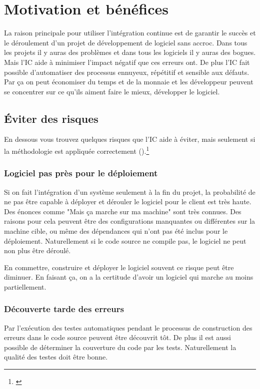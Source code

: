 \chapter{Motivation et bénéfices}

La raison principale pour utiliser l'intégration continue est de garantir le succès et le déroulement d'un projet de développement de logiciel sans accroc. Dans tous les projets il y auras des problèmes et dans tous les logiciels il y auras des bogues. Mais l'IC aide à minimiser l'impact négatif que ces erreurs ont. De plus l'IC fait possible d'automatiser des processus ennuyeux, répétitif et sensible aux défauts. Par ça on peut économiser du temps et de la monnaie et les développeur peuvent se concentrer sur ce qu'ils aiment faire le mieux, développer le logiciel.

\section{Éviter des risques}
En dessous vous trouvez quelques risques que l'IC aide à éviter, mais seulement si la méthodologie est appliquée correctement ().\footnote{\cite[p39]{duvallconint}} 
\subsection{Logiciel pas près pour le déploiement}
Si on fait l'intégration d'un système seulement à la fin du projet, la probabilité de ne pas être capable à déployer et dérouler le logiciel pour le client est très haute. Des énonces comme "Mais ça marche sur ma machine" sont très connues. Des raisons pour cela peuvent être des configurations manquantes ou différentes sur la machine cible, ou même des dépendances qui n'ont pas été inclus pour le déploiement. Naturellement si le code source ne compile pas, le logiciel ne peut non plus être déroulé.

En commettre, construire et déployer le logiciel souvent ce risque peut être diminuer. En faisant ça, on a la certitude d'avoir un logiciel qui marche au moins partiellement.

\subsection{Découverte tarde des erreurs}
Par l'exécution des testes automatiques pendant le processus de construction des erreurs dans le code source peuvent être découvrit tôt. De plus il est aussi possible de déterminer la couverture du code par les tests. Naturellement la qualité des testes doit être bonne.

